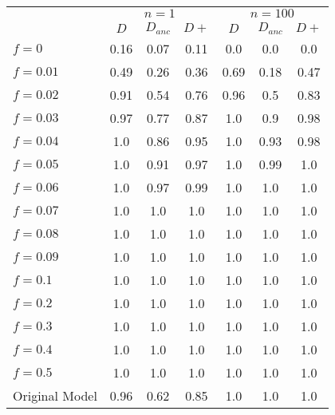 \begin{tabular}{@{}lcccccc@{}}
\toprule
 & \multicolumn{3}{c}{$n=1$} & \multicolumn{3}{c}{$n=100$} \\
\cmidrule(lr){2-4} \cmidrule(lr){5-7}
 & $D$ & $D_{anc}$ & $D+$ & $D$ & $D_{anc}$ & $D+$ \\
\midrule
$f = 0$ & 0.16 & 0.07 & 0.11 & 0.0 & 0.0 & 0.0 \\
$f = 0.01$ & 0.49 & 0.26 & 0.36 & 0.69 & 0.18 & 0.47 \\
$f = 0.02$ & 0.91 & 0.54 & 0.76 & 0.96 & 0.5 & 0.83 \\
$f = 0.03$ & 0.97 & 0.77 & 0.87 & 1.0 & 0.9 & 0.98 \\
$f = 0.04$ & 1.0 & 0.86 & 0.95 & 1.0 & 0.93 & 0.98 \\
$f = 0.05$ & 1.0 & 0.91 & 0.97 & 1.0 & 0.99 & 1.0 \\
$f = 0.06$ & 1.0 & 0.97 & 0.99 & 1.0 & 1.0 & 1.0 \\
$f = 0.07$ & 1.0 & 1.0 & 1.0 & 1.0 & 1.0 & 1.0 \\
$f = 0.08$ & 1.0 & 1.0 & 1.0 & 1.0 & 1.0 & 1.0 \\
$f = 0.09$ & 1.0 & 1.0 & 1.0 & 1.0 & 1.0 & 1.0 \\
$f = 0.1$ & 1.0 & 1.0 & 1.0 & 1.0 & 1.0 & 1.0 \\
$f = 0.2$ & 1.0 & 1.0 & 1.0 & 1.0 & 1.0 & 1.0 \\
$f = 0.3$ & 1.0 & 1.0 & 1.0 & 1.0 & 1.0 & 1.0 \\
$f = 0.4$ & 1.0 & 1.0 & 1.0 & 1.0 & 1.0 & 1.0 \\
$f = 0.5$ & 1.0 & 1.0 & 1.0 & 1.0 & 1.0 & 1.0 \\
Original Model & 0.96 & 0.62 & 0.85 & 1.0 & 1.0 & 1.0 \\
\bottomrule
\end{tabular}
